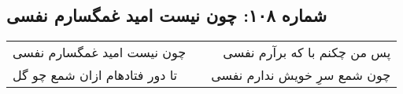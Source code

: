 \begin{center}
\section*{شماره ۱۰۸: چون نیست امید غمگسارم نفسی}
\label{sec:108}
\begin{longtable}{l p{0.5cm} r}
چون نیست امید غمگسارم نفسی
&&
پس من چکنم با که برآرم نفسی
\\
تا دور فتادهام ازان شمع چو گل
&&
چون شمع سرِ خویش ندارم نفسی
\\
\end{longtable}
\end{center}
